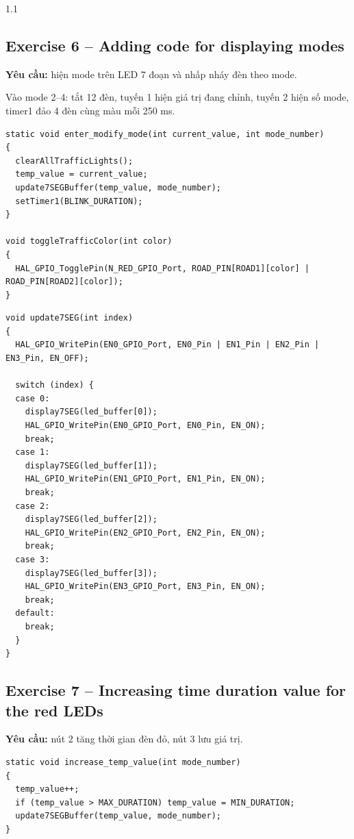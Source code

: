 \documentclass[a4paper,12pt]{article}
\begin{document}
\begin{spacing}{1.1}
\subsection*{Exercise 6 -- Adding code for displaying modes}

\textbf{Yêu cầu:} hiện mode trên LED 7 đoạn và nhấp nháy đèn theo mode.

Vào mode 2--4: tắt 12 đèn, tuyến 1 hiện giá trị đang chỉnh, tuyến 2 hiện số mode, timer1 đảo 4 đèn cùng màu mỗi 250 ms.

\begin{lstlisting}[caption={Exercise 6 -- vao mode chinh sua va dao den}]
static void enter_modify_mode(int current_value, int mode_number)
{
  clearAllTrafficLights();
  temp_value = current_value;
  update7SEGBuffer(temp_value, mode_number);
  setTimer1(BLINK_DURATION);
}

void toggleTrafficColor(int color)
{
  HAL_GPIO_TogglePin(N_RED_GPIO_Port, ROAD_PIN[ROAD1][color] | ROAD_PIN[ROAD2][color]);
}
\end{lstlisting}

\begin{lstlisting}[caption={Exercise 6 -- quet LED 7 doan (led\_display.c)}]
void update7SEG(int index)
{
  HAL_GPIO_WritePin(EN0_GPIO_Port, EN0_Pin | EN1_Pin | EN2_Pin | EN3_Pin, EN_OFF);

  switch (index) {
  case 0:
    display7SEG(led_buffer[0]);
    HAL_GPIO_WritePin(EN0_GPIO_Port, EN0_Pin, EN_ON);
    break;
  case 1:
    display7SEG(led_buffer[1]);
    HAL_GPIO_WritePin(EN1_GPIO_Port, EN1_Pin, EN_ON);
    break;
  case 2:
    display7SEG(led_buffer[2]);
    HAL_GPIO_WritePin(EN2_GPIO_Port, EN2_Pin, EN_ON);
    break;
  case 3:
    display7SEG(led_buffer[3]);
    HAL_GPIO_WritePin(EN3_GPIO_Port, EN3_Pin, EN_ON);
    break;
  default:
    break;
  }
}
\end{lstlisting}

\subsection*{Exercise 7 -- Increasing time duration value for the red LEDs}

\textbf{Yêu cầu:} nút 2 tăng thời gian đèn đỏ, nút 3 lưu giá trị.

\begin{lstlisting}[caption={Exercise 7 -- tang gia tri 1 - 99 va mode 2}]
static void increase_temp_value(int mode_number)
{
  temp_value++;
  if (temp_value > MAX_DURATION) temp_value = MIN_DURATION;
  update7SEGBuffer(temp_value, mode_number);
}


\end{lstlisting}
\end{spacing}
\end{document}
